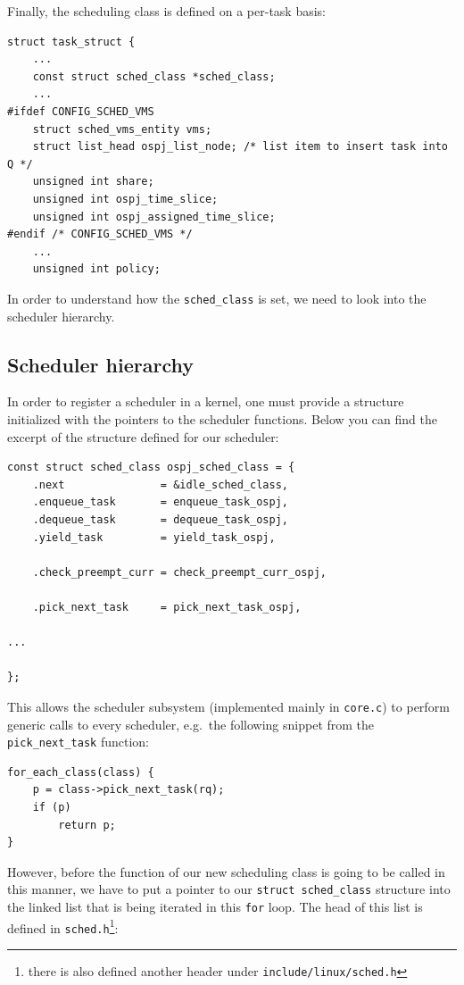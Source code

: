 \documentclass[]{report}
\begin{document}
Finally, the scheduling class is defined on a per-task basis:

\begin{lstlisting}[style=c, caption=include/linux/sched.h, firstnumber=1055]
struct task_struct {
    ...
    const struct sched_class *sched_class;
    ...
#ifdef CONFIG_SCHED_VMS
    struct sched_vms_entity vms;
    struct list_head ospj_list_node; /* list item to insert task into Q */
    unsigned int share;
    unsigned int ospj_time_slice;
    unsigned int ospj_assigned_time_slice;
#endif /* CONFIG_SCHED_VMS */
    ...
    unsigned int policy;
\end{lstlisting}

In order to understand how the \lstinline!sched_class! is set, we need
to look into the scheduler hierarchy.

\subsection{Scheduler hierarchy}\label{scheduler-hierarchy}

In order to register a scheduler in a kernel, one must provide a
structure initialized with the pointers to the scheduler functions.
Below you can find the excerpt of the structure defined for our
scheduler:

\begin{lstlisting}[style=c, caption=ospj.c, firstnumber=556]
const struct sched_class ospj_sched_class = {
    .next               = &idle_sched_class,
    .enqueue_task       = enqueue_task_ospj,
    .dequeue_task       = dequeue_task_ospj,
    .yield_task         = yield_task_ospj,

    .check_preempt_curr = check_preempt_curr_ospj,

    .pick_next_task     = pick_next_task_ospj,

...

};
\end{lstlisting}

This allows the scheduler subsystem (implemented mainly in
\lstinline!core.c!) to perform generic calls to every scheduler,
e.g.~the following snippet from the \lstinline!pick_next_task! function:

\begin{lstlisting}[style=c, caption=core.c, firstnumber=2949]
for_each_class(class) {
    p = class->pick_next_task(rq);
    if (p)
        return p;
}
\end{lstlisting}

However, before the function of our new scheduling class is going to be
called in this manner, we have to put a pointer to our
\lstinline!struct sched_class! structure into the linked list that is
being iterated in this \lstinline!for! loop. The head of this list is
defined in \lstinline!sched.h!\footnote{there is also defined another
  header under \lstinline!include/linux/sched.h!}:
\end{document}
